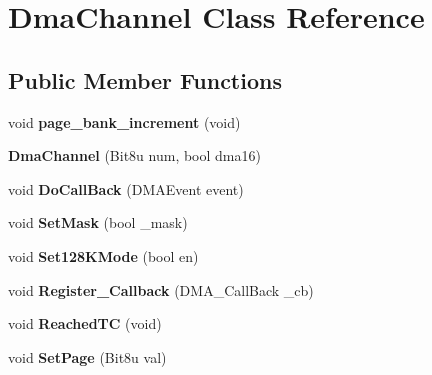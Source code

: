 \hypertarget{classDmaChannel}{\section{Dma\-Channel Class Reference}
\label{classDmaChannel}
}
\subsection*{Public Member Functions}
\begin{DoxyCompactItemize}
\item 
\hypertarget{classDmaChannel_a62aad1f9ded73ccca0777269ff9655d8}{void {\bfseries page\-\_\-bank\-\_\-increment} (void)}\label{classDmaChannel_a62aad1f9ded73ccca0777269ff9655d8}

\item 
\hypertarget{classDmaChannel_acbbb585f3c95c5c83073644a939b6e36}{{\bfseries Dma\-Channel} (Bit8u num, bool dma16)}\label{classDmaChannel_acbbb585f3c95c5c83073644a939b6e36}

\item 
\hypertarget{classDmaChannel_a21479bb39f01212ebf26954a6c8c261f}{void {\bfseries Do\-Call\-Back} (D\-M\-A\-Event event)}\label{classDmaChannel_a21479bb39f01212ebf26954a6c8c261f}

\item 
\hypertarget{classDmaChannel_a0741a67ee1cce33702c1d372d88d41ed}{void {\bfseries Set\-Mask} (bool \-\_\-mask)}\label{classDmaChannel_a0741a67ee1cce33702c1d372d88d41ed}

\item 
\hypertarget{classDmaChannel_a11b7eaae4166a03aaa88b359ee332127}{void {\bfseries Set128\-K\-Mode} (bool en)}\label{classDmaChannel_a11b7eaae4166a03aaa88b359ee332127}

\item 
\hypertarget{classDmaChannel_a01e21c2bf367fe83ceeebaffb62ddf1d}{void {\bfseries Register\-\_\-\-Callback} (D\-M\-A\-\_\-\-Call\-Back \-\_\-cb)}\label{classDmaChannel_a01e21c2bf367fe83ceeebaffb62ddf1d}

\item 
\hypertarget{classDmaChannel_aaaf6f979441b79aa54654a10c41dbb2f}{void {\bfseries Reached\-T\-C} (void)}\label{classDmaChannel_aaaf6f979441b79aa54654a10c41dbb2f}

\item 
\hypertarget{classDmaChannel_a0241d66f4aa3bb8984f5d67366400f66}{void {\bfseries Set\-Page} (Bit8u val)}\label{classDmaChannel_a0241d66f4aa3bb8984f5d67366400f66}


\end{DoxyCompactItemize}
